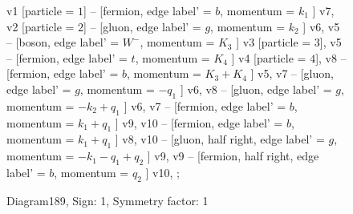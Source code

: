 \documentclass{revtex4}
\begin{document}
\begin{figure}[!htb]
\begin{center}
{    %
v1 [particle = \(1\)] -- [fermion, edge label' = \(b\), momentum = \(k_{1}\) ] v7, 
v2 [particle = \(2\)] -- [gluon, edge label' = \(g\), momentum = \(k_{2}\) ] v6, 
v5 -- [boson, edge label' = \(W^{-}\), momentum = \(K_{3}\) ] v3 [particle = \(3\)], 
v5 -- [fermion, edge label' = \(t\), momentum = \(K_{4}\) ] v4 [particle = \(4\)], 
v8 -- [fermion, edge label' = \(b\), momentum = \(K_{3} + K_{4}\) ] v5, 
v7 -- [gluon, edge label' = \(g\), momentum = \(-q_{1}\) ] v6, 
v8 -- [gluon, edge label' = \(g\), momentum = \(-k_{2} + q_{1}\) ] v6, 
v7 -- [fermion, edge label' = \(b\), momentum = \(k_{1} + q_{1}\) ] v9, 
v10 -- [fermion, edge label' = \(b\), momentum = \(k_{1} + q_{1}\) ] v8, 
v10 -- [gluon, half right, edge label' = \(g\), momentum = \(-k_{1} - q_{1} + q_{2}\) ] v9, 
v9 -- [fermion, half right, edge label' = \(b\), momentum = \(q_{2}\) ] v10, 
};
\end{center}
\caption{Diagram189, Sign: 1, Symmetry factor: 1}
\end{figure}
\newpage
\end{document}

